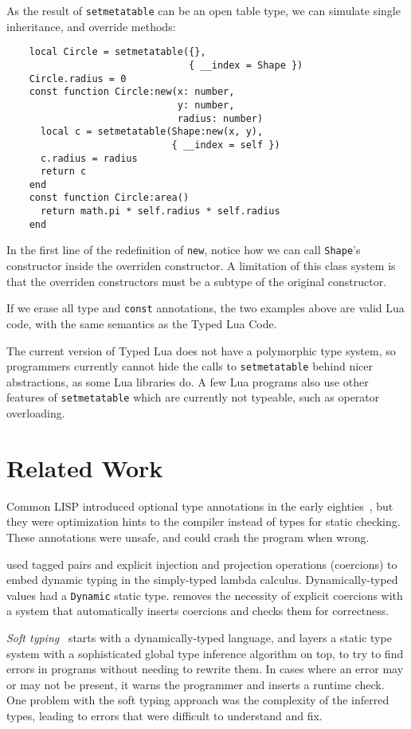 \documentclass[preprint]{sig-alternate}
\begin{document}
As the result of {\tt setmetatable} can be an open
table type, we can simulate single inheritance, and
override methods:

\begin{verbatim}
    local Circle = setmetatable({},
                                { __index = Shape })
    Circle.radius = 0
    const function Circle:new(x: number,
                              y: number,
                              radius: number)
      local c = setmetatable(Shape:new(x, y),
                             { __index = self })
      c.radius = radius
      return c
    end
    const function Circle:area()
      return math.pi * self.radius * self.radius
    end
\end{verbatim} 

In the first line of the redefinition of {\tt new},
notice how we can call {\tt Shape}'s constructor inside
the overriden constructor. A limitation of this class
system is that the overriden constructors must be a
subtype of the original constructor.

If we erase all type and {\tt const} annotations, the
two examples above are valid Lua code, with the same
semantics as the Typed Lua Code.

The current version of Typed Lua does not have a polymorphic
type system, so programmers currently cannot hide the
calls to {\tt setmetatable} behind nicer abstractions, as
some Lua libraries do. A few Lua programs also use
other features of {\tt setmetatable} which are currently
not typeable, such as operator overloading.

\section{Related Work}
\label{sec:review}

Common LISP introduced optional type annotations in the early
eighties~\citep{steele1982ocl}, but they were optimization
hints to the compiler instead of types for static checking.
These annotations were unsafe, and could crash the program
when wrong.

\citet{abadi1989dts} used tagged pairs and explicit
injection and projection operations (coercions) to embed dynamic
typing in the simply-typed lambda calculus. Dynamically-typed
values had a {\tt Dynamic} static type. \citet{thatte1990qst}
removes the necessity of explicit coercions with a system
that automatically inserts coercions and checks them for
correctness.

\textit{Soft typing}~\citep{cartwright1991soft} starts
with a dynamically-typed language, and layers a static
type system with a sophisticated global type inference
algorithm on top, to try to find errors in programs
without needing to rewrite them. In cases where an error
may or may not be present, it warns the programmer and
inserts a runtime check. One problem with the soft
typing approach was the complexity of the inferred
types, leading to errors that were difficult to understand
and fix.
\end{document}
